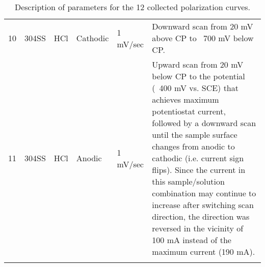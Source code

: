 \begin{longtable}{lccp{2.5cm}p{2.5cm}p{6cm}}
	10 & 304SS & HCl & Cathodic & 1 mV/sec & Downward scan from 20 mV above CP to ~700 mV below CP. \\
	11 & 304SS & HCl & Anodic & 1 mV/sec & Upward scan from 20 mV below CP to the potential (~400 mV vs. SCE) that achieves maximum potentiostat current, followed by a downward scan until the sample surface changes from anodic to cathodic (i.e. current sign flips).  Since the current in this sample/solution combination may continue to increase after switching scan direction, the direction was reversed in the vicinity of 100 mA instead of the maximum current (190 mA). \\
	\bottomrule
	\caption{Description of parameters for the 12 collected polarization curves.}
	\label{table:sweeps_full}
\end{longtable}
\doublespacing
